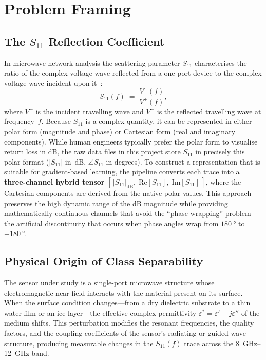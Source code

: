
\section{Problem Framing}
\label{sec:problem}

\subsection{The $S_{11}$ Reflection Coefficient}
\label{sec:problem:s11}

In microwave network analysis the scattering parameter $S_{11}$
characterises the ratio of the complex voltage wave reflected from a
one-port device to the complex voltage wave incident upon
it~\cite{pozar2011microwave}:
\begin{equation}
    S_{11}(f) \;=\; \frac{V^{-}(f)}{V^{+}(f)},
    \label{eq:s11_def}
\end{equation}
where $V^{+}$ is the incident travelling wave and $V^{-}$ is the
reflected travelling wave at frequency~$f$.  Because $S_{11}$ is a
complex quantity, it can be represented in either polar form (magnitude and
phase) or Cartesian form (real and imaginary components). While human engineers
typically prefer the polar form to visualise return loss in \si{\deci\bel},
the raw data files in this project store $S_{11}$ in precisely this
polar format ($|S_{11}|$ in~dB, $\angle S_{11}$ in degrees).  To
construct a representation that is suitable for gradient-based learning,
the pipeline converts each trace into a \textbf{three-channel hybrid
tensor} $[\,|S_{11}|_{\text{dB}},\;\text{Re}[S_{11}],\;
\text{Im}[S_{11}]\,]$, where the Cartesian components are derived from
the native polar values.  This approach preserves the high dynamic range
of the dB magnitude while providing mathematically continuous channels
that avoid the ``phase wrapping'' problem---the artificial discontinuity
that occurs when phase angles wrap from $\SI{+180}{\degree}$ to
$\SI{-180}{\degree}$.

\subsection{Physical Origin of Class Separability}
\label{sec:problem:physics}

The sensor under study is a single-port microwave structure whose
electromagnetic near-field interacts with the material present on its
surface.  When the surface condition changes—from a dry dielectric
substrate to a thin water film or an ice layer—the effective complex
permittivity $\varepsilon^{*} = \varepsilon' - j\varepsilon''$ of the
medium shifts.  This perturbation modifies the resonant frequencies, the
quality factors, and the coupling coefficients of the sensor's radiating
or guided-wave structure, producing measurable changes in the
$S_{11}(f)$ trace across the \SIrange{8}{12}{\giga\hertz} band.

